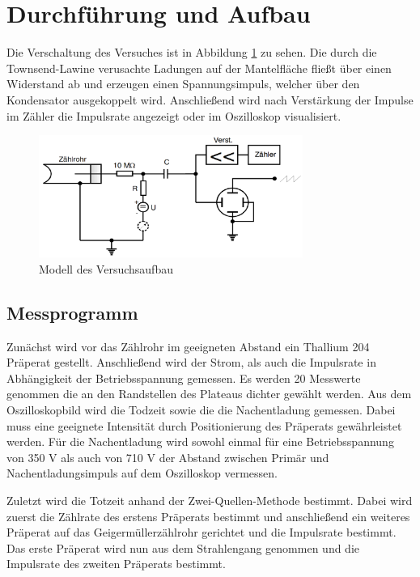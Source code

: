 \section{Durchführung und Aufbau}
\label{sec:Durchführung}
Die Verschaltung des Versuches ist in Abbildung \ref{fig:Aufbau} zu sehen. Die durch die Townsend-Lawine verusachte Ladungen auf der Mantelfläche fließt über einen Widerstand ab und erzeugen einen Spannungsimpuls, welcher über den Kondensator ausgekoppelt wird. Anschließend wird nach Verstärkung der Impulse im Zähler die Impulsrate angezeigt oder im Oszilloskop visualisiert.
\begin{figure}
  \centering
  \includegraphics[height=4cm]{picture/Aufbau.pdf}
  \caption{Modell des Versuchsaufbau \cite{sample}}
  \label{fig:Aufbau}
\end{figure}
\subsection{Messprogramm}
Zunächst wird vor das Zählrohr im geeigneten Abstand ein Thallium 204 Präperat gestellt. Anschließend wird der Strom, als auch die Impulsrate in Abhängigkeit der Betriebsspannung gemessen. Es werden 20 Messwerte genommen die an den Randstellen des Plateaus dichter gewählt werden. 
Aus dem Oszilloskopbild wird die Todzeit sowie die die Nachentladung gemessen. Dabei muss eine geeignete Intensität durch Positionierung des Präperats gewährleistet werden. Für die Nachentladung wird sowohl einmal für eine Betriebsspannung von 350 V als auch von 710 V der Abstand zwischen Primär und Nachentladungsimpuls auf dem Oszilloskop vermessen. 

Zuletzt wird die Totzeit anhand der Zwei-Quellen-Methode bestimmt. Dabei wird zuerst die Zählrate des erstens Präperats bestimmt und anschließend ein weiteres Präperat auf das Geigermüllerzählrohr gerichtet und die Impulsrate bestimmt. Das erste Präperat wird nun aus dem Strahlengang genommen und die Impulsrate des zweiten Präperats bestimmt. 
